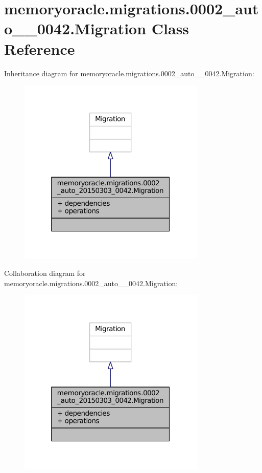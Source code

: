 \hypertarget{classmemoryoracle_1_1migrations_1_10002__auto__20150303__0042_1_1Migration}{}\section{memoryoracle.\+migrations.0002\+\_\+auto\+\_\+\_\+0042.Migration Class Reference}
\label{classmemoryoracle_1_1migrations_1_10002__auto__20150303__0042_1_1Migration}


Inheritance diagram for memoryoracle.\+migrations.0002\+\_\+auto\+\_\+\_\+0042.Migration\+:\nopagebreak
\begin{figure}[H]
\begin{center}
\leavevmode
\includegraphics[width=253pt]{classmemoryoracle_1_1migrations_1_10002__auto__20150303__0042_1_1Migration__inherit__graph}
\end{center}
\end{figure}


Collaboration diagram for memoryoracle.\+migrations.0002\+\_\+auto\+\_\+\_\+0042.Migration\+:\nopagebreak
\begin{figure}[H]
\begin{center}
\leavevmode
\includegraphics[width=253pt]{classmemoryoracle_1_1migrations_1_10002__auto__20150303__0042_1_1Migration__coll__graph}
\end{center}
\end{figure}
